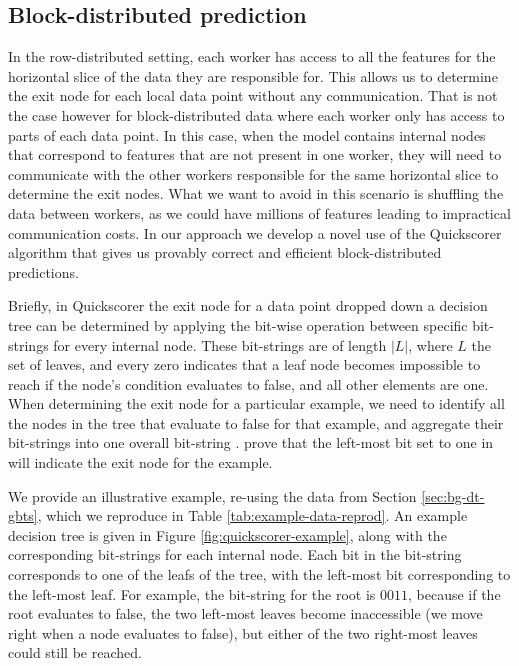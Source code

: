 \subsection{Block-distributed prediction}
\label{subsec:block-gbt-prediction}

In the row-distributed setting, each worker has access to all the features for the
horizontal slice of the data they are responsible for. This allows us to determine
the exit node for each local data point without any communication.
That is not the case however
for block-distributed data where each worker only has access to parts of each data
point. In this case, when the model contains internal nodes that correspond to features
that are not present in one worker, they will need to communicate with the other
workers responsible for the same horizontal slice to determine the exit nodes.
What we want to avoid in this scenario is shuffling the data between workers,
as we could have millions of features leading to impractical communication
costs. In our approach we develop a novel use of the Quickscorer \cite{quickscorer} algorithm
that gives us provably correct and efficient block-distributed predictions.

Briefly, in Quickscorer the exit node for a data point dropped down a decision tree can be determined by applying the bit-wise
\AND operation between specific bit-strings for every internal node.
These bit-strings are of length $|L|$, where $L$ the set of leaves, and
every zero indicates that a leaf node becomes impossible to reach if the node's
condition evaluates to false, and all other elements are one. When determining
the exit node for a particular example, we need to identify all the nodes in
the tree that evaluate to false for that example, and aggregate their bit-strings into one overall
bit-string \bitstring.
\citet{quickscorer}
prove that the left-most bit set to one in \bitstring will indicate the exit node for the example.

We provide an illustrative example, re-using the data from Section \ref{sec:bg-dt-gbts},
which we reproduce in Table \ref{tab:example-data-reprod}. An example decision tree
is given in Figure \ref{fig:quickscorer-example}, along with the corresponding
bit-strings for each internal node. Each bit in the bit-string
corresponds to one of the leafs of the tree, with the left-most bit corresponding
to the left-most leaf. For example, the bit-string for the root is $0011$, because
if the root evaluates to false, the two left-most leaves become inaccessible
(we move right when a node evaluates to false), but either of the
two right-most leaves could still be reached.

